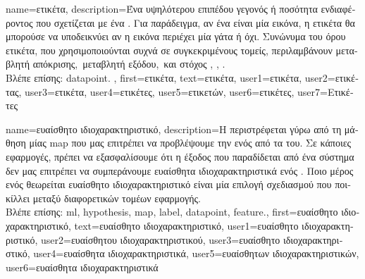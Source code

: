 {name={\foreignlanguage{greek}{ετικέτα}},
	description={\foreignlanguage{greek}{Ένα υψηλότερου επιπέδου γεγονός ή ποσότητα ενδιαφέροντος} 
		\foreignlanguage{greek}{που σχετίζεται με ένα} . \foreignlanguage{greek}{Για παράδειγμα, αν ένα}  
		\foreignlanguage{greek}{είναι μία εικόνα, η ετικέτα θα μπορούσε να υποδεικνύει αν η εικόνα περιέχει μία γάτα ή όχι. 
		Συνώνυμα του όρου ετικέτα, που χρησιμοποι\-ού\-νται συχνά σε συγκεκριμένους τομείς, περιλαμβάνουν 
		\guillemotleft μεταβλητή απόκρισης,\guillemotright\ \guillemotleft μεταβλητή εξόδου,\guillemotright\ και \guillemotleft στόχος\guillemotright} 
		\cite{Gujarati2021}, \cite{Dodge2003}, \cite{Everitt2022}.\\
		\foreignlanguage{greek}{Βλέπε επίσης:} \gls{datapoint}. },
	first={\foreignlanguage{greek}{ετικέτα}},
	text={\foreignlanguage{greek}{ετικέτα}},
	user1={\foreignlanguage{greek}{ετικέτα}}, %
  	user2={\foreignlanguage{greek}{ετικέτας}}, %
	user3={\foreignlanguage{greek}{ετικέτα}}, %
	user4={\foreignlanguage{greek}{ετικέτες}}, %
  	user5={\foreignlanguage{greek}{ετικετών}}, %
	user6={\foreignlanguage{greek}{ετικέτες}}, %
	user7={\foreignlanguage{greek}{Ετικέτες}} %
}

{name={\foreignlanguage{greek}{ευαίσθητο ιδιοχαρακτηριστικό}},
	description={\foreignlanguage{greek}{Η}  
		\foreignlanguage{greek}{περιστρέφεται γύρω από τη μάθηση μίας} \gls{map}  
		\foreignlanguage{greek}{που μας επιτρέπει να προβλέψουμε την}  \foreignlanguage{greek}{ενός} 
		 \foreignlanguage{greek}{από τα}  \foreignlanguage{greek}{του}. 
		\foreignlanguage{greek}{Σε κάποιες εφαρμογές, πρέπει να εξασφαλίσουμε ότι η έξοδος που παραδίδεται 
		από ένα σύστημα}  \foreignlanguage{greek}{δεν μας επιτρέπει να συμπεράνουμε 
		ευαί\-σθητα ιδιοχαρακτηριστικά ενός} . \foreignlanguage{greek}{Ποιο μέρος  
		ενός}  \foreignlanguage{greek}{θεωρείται ευαίσθητο ιδιοχαρακτηριστικό είναι μία 
		επιλογή σχεδιασμού που ποικίλλει μεταξύ διαφορετικών τομέων εφαρμογής.}\\
		\foreignlanguage{greek}{Βλέπε επίσης:} \gls{ml}, \gls{hypothesis}, \gls{map}, \gls{label}, \gls{datapoint}, \gls{feature}.},
	first={\foreignlanguage{greek}{ευαίσθητο ιδιοχαρακτηριστικό}},
	text={\foreignlanguage{greek}{ευαίσθητο ιδιοχαρακτηριστικό}},
	user1={\foreignlanguage{greek}{ευαίσθητο ιδιοχαρακτηριστικό}}, %
    	user2={\foreignlanguage{greek}{ευαίσθητου ιδιοχαρακτηριστικού}}, %
	user3={\foreignlanguage{greek}{ευαίσθητο ιδιοχαρακτηριστικό}}, %
	user4={\foreignlanguage{greek}{ευαίσθητα ιδιοχαρακτηριστικά}}, %
    	user5={\foreignlanguage{greek}{ευαίσθητων ιδιοχαρακτηριστικών}}, %
	user6={\foreignlanguage{greek}{ευαίσθητα ιδιοχαρακτηριστικά}} %
}

